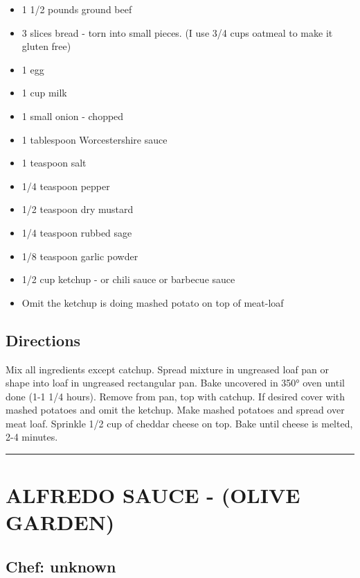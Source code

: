 \documentclass[
]{book}
\providecommand{\tightlist}{%
  \setlength{\itemsep}{0pt}\setlength{\parskip}{0pt}}
\begin{document}
\begin{itemize}
\tightlist
\item
  1 1/2 pounds ground beef
\item
  3 slices bread - torn into small pieces. (I use 3/4 cups oatmeal to make it gluten free)
\item
  1 egg
\item
  1 cup milk
\item
  1 small onion - chopped
\item
  1 tablespoon Worcestershire sauce
\item
  1 teaspoon salt
\item
  1/4 teaspoon pepper
\item
  1/2 teaspoon dry mustard
\item
  1/4 teaspoon rubbed sage
\item
  1/8 teaspoon garlic powder
\item
  1/2 cup ketchup - or chili sauce or barbecue sauce
\item
  Omit the ketchup is doing mashed potato on top of meat-loaf
\end{itemize}

\hypertarget{directions-61}{%
\subsection*{Directions}\label{directions-61}}


Mix all ingredients except catchup. Spread mixture in ungreased loaf pan or shape into loaf in ungreased
rectangular pan. Bake uncovered in 350° oven until done (1-1 1/4 hours). Remove from pan, top with catchup.
If desired cover with mashed potatoes and omit the ketchup. Make mashed potatoes and spread over
meat loaf. Sprinkle 1/2 cup of cheddar cheese on top. Bake until cheese is melted, 2-4 minutes.

\begin{center}\rule{0.5\linewidth}{0.5pt}\end{center}

\hypertarget{alfredo-sauce---olive-garden}{%
\section*{ALFREDO SAUCE - (OLIVE GARDEN)}\label{alfredo-sauce---olive-garden}}


\hypertarget{chef-unknown}{%
\subsection*{Chef: unknown}\label{chef-unknown}}
\end{document}

